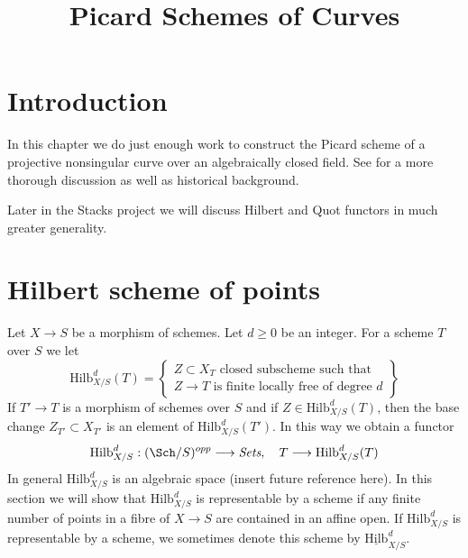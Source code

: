 

%


\title{Picard Schemes of Curves}


\maketitle

\label{section-phantom}

\tableofcontents


\section{Introduction}
\label{section-introduction}

\noindent
In this chapter we do just enough work to construct the Picard scheme
of a projective nonsingular curve over an algebraically closed field.
See \cite{Kleiman-Picard} for a more thorough discussion as well as
historical background.

\medskip\noindent
Later in the Stacks project we will discuss Hilbert and Quot functors
in much greater generality.


\section{Hilbert scheme of points}
\label{section-hilbert-scheme-points}

\noindent
Let $X \to S$ be a morphism of schemes. Let $d \geq 0$ be an integer.
For a scheme $T$ over $S$ we let
$$
\text{Hilb}^d_{X/S}(T) =
\left\{
\begin{matrix}
Z \subset X_T\text{ closed subscheme such that }\\
Z \to T\text{ is finite locally free of degree }d
\end{matrix}
\right\}
$$
If $T' \to T$ is a morphism of schemes over $S$ and if
$Z \in \text{Hilb}^d_{X/S}(T)$, then the base change
$Z_{T'} \subset X_{T'}$ is an element of $\text{Hilb}^d_{X/S}(T')$.
In this way we obtain a functor
$$
\text{Hilb}^d_{X/S} :
(\Sch/S)^{opp} \longrightarrow \textit{Sets},\quad
T \longrightarrow \text{Hilb}^d_{X/S}(T)
$$
In general $\text{Hilb}^d_{X/S}$ is an algebraic space
(insert future reference here). In this section we will
show that $\text{Hilb}^d_{X/S}$ is representable
by a scheme if any finite number of points in a fibre of
$X \to S$ are contained in an affine open.
If $\text{Hilb}^d_{X/S}$ is representable by a scheme, we sometimes
denote this scheme by $\underline{\text{Hilb}}^d_{X/S}$.

